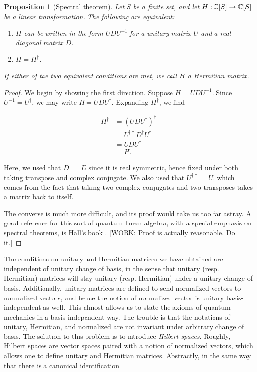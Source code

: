 \documentclass{article}
\newtheorem{proposition}{Proposition}[section]
\theoremstyle{definition}
\numberwithin{figure}{section}
\begin{document}
\begin{proposition}[Spectral theorem]\label{Spectral theorem} Let $S$ be a finite set, and let $H: \mathbb{C}[S]\to \mathbb{C}[S]$ be a linear transformation. The following are equivalent:

\begin{enumerate}
\item $H$ can be written in the form $UDU^{-1}$ for a unitary matrix $U$ and a real diagonal matrix $D$.
\item $H=H^{\dagger}$.
\end{enumerate}

If either of the two equivalent conditions are met, we call $H$ a Hermitian matrix.
\end{proposition}
\begin{proof} We begin by showing the first direction. Suppose $H=UDU^{-1}$. Since $U^{-1}=U^{\dagger}$, we may write $H=UDU^{\dagger}$. Expanding $H^{\dagger}$, we find

\begin{align*}
H^{\dagger}&=(UDU^{\dagger})^{\dagger}\\
&=U^{\dagger\dagger}D^{\dagger}U^{\dagger}\\
&=UDU^{\dagger}\\
&=H.
\end{align*}

Here, we used that $D^{\dagger}=D$ since it is real symmetric, hence fixed under both taking transpose and complex conjugate. We also used that $U^{\dagger\dagger}=U$, which comes from the fact that taking two complex conjugates and two transposes takes a matrix back to itself.

The converse is much more difficult, and its proof would take us too far astray. A good reference for this sort of quantum linear algebra, with a special emphasis on spectral theorems, is Hall's book \cite{hall2013quantum}. [WORK: Proof is actually reasonable. Do it.]
\end{proof}
 
The conditions on unitary and Hermitian matrices we have obtained are independent of unitary change of basis, in the sense that unitary (resp. Hermitian) matrices will stay unitary (resp. Hermitian) under a unitary change of basis. Additionally, unitary matrices are defined to send normalized vectors to normalized vectors, and hence the notion of normalized vector is unitary basis-independent as well. This almost allows us to state the axioms of quantum mechanics in a basis independent way. The trouble is that the notations of unitary, Hermitian, and normalized are not invariant under arbitrary change of basis. The solution to this problem is to introduce \textit{Hilbert spaces}. Roughly, Hilbert spaces are vector spaces paired with a notion of normalized vectors, which allows one to define unitary and Hermitian matrices. Abstractly, in the same way that there is a canonical identification
\end{document}
